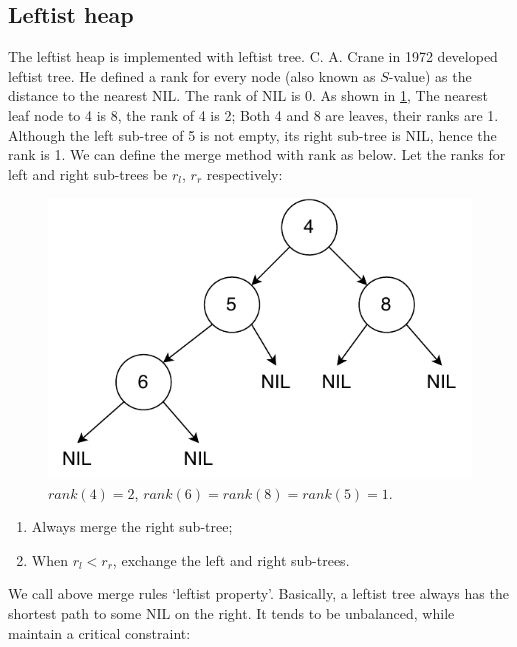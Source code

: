 \documentclass[b5paper]{article}
\begin{document}
\subsection{Leftist heap}
  

The leftist heap is implemented with leftist tree. C. A. Crane in 1972\cite{wiki-leftist-tree} developed leftist tree. He defined a rank for every node (also known as $S$-value) as the distance to the nearest NIL. The rank of NIL is 0. As shown in \cref{fig:rank}, The nearest leaf node to 4 is 8, the rank of 4 is 2; Both 4 and 8 are leaves, their ranks are 1. Although the left sub-tree of 5 is not empty, its right sub-tree is NIL, hence the rank is 1. We can define the merge method with rank as below. Let the ranks for left and right sub-trees be $r_l$, $r_r$ respectively:

\begin{figure}[htbp]
  \centering
  \includegraphics[scale=0.6]{img/rank}
  \caption{$rank(4) = 2$, $rank(6) = rank(8) = rank(5) = 1$.}
  \label{fig:rank}
\end{figure}

\begin{enumerate}
\item Always merge the right sub-tree;
\item When $r_l < r_r$, exchange the left and right sub-trees.
\end{enumerate}

We call above merge rules `leftist property'. Basically, a leftist tree always has the shortest path to some NIL on the right. It tends to be unbalanced, while maintain a critical constraint:
\end{document}
